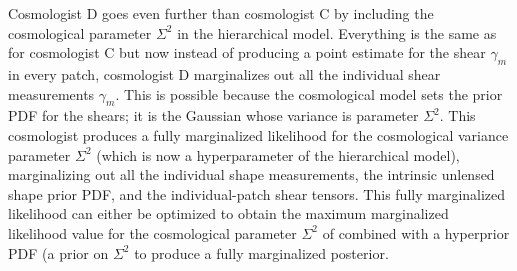 \documentclass[12pt]{article}
\begin{document}
Cosmologist D goes even further than cosmologist C by including the
cosmological parameter $\Sigma^2$ in the hierarchical model.
Everything is the same as for cosmologist C but now instead of
producing a point estimate for the shear $\gamma_m$ in every patch,
cosmologist D marginalizes out all the individual shear measurements
$\gamma_m$.  This is possible because the cosmological model sets the
prior PDF for the shears; it is the Gaussian whose variance is
parameter $\Sigma^2$.  This cosmologist produces a fully marginalized
likelihood for the cosmological variance parameter $\Sigma^2$ (which
is now a hyperparameter of the hierarchical model), marginalizing out
all the individual shape measurements, the intrinsic unlensed shape
prior PDF, and the individual-patch shear tensors.  This fully
marginalized likelihood can either be optimized to obtain the maximum
marginalized likelihood value for the cosmological parameter
$\Sigma^2$ of combined with a hyperprior PDF (a prior on $\Sigma^2$ to
produce a fully marginalized posterior.
\end{document}
